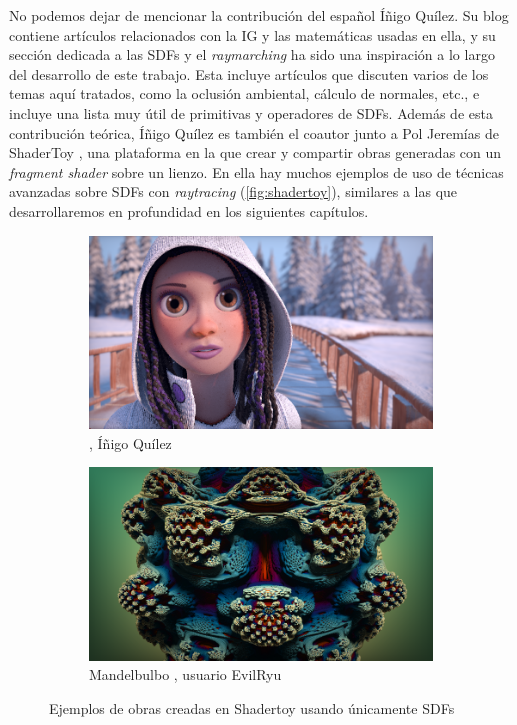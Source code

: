 No podemos dejar de mencionar la contribución del español Íñigo Quílez. Su blog \cite{Quilez_undated-oh} contiene artículos relacionados con la IG y las matemáticas usadas en ella, y su sección dedicada a las SDFs y el \textit{raymarching} ha sido una inspiración a lo largo del desarrollo de este trabajo. Esta incluye artículos que discuten varios de los temas aquí tratados, como la oclusión ambiental, cálculo de normales, etc., e incluye una lista muy útil de primitivas y operadores de SDFs. Además de esta contribución teórica, Íñigo Quílez es también el coautor junto a Pol Jeremías de ShaderToy \cite{shadertoy}, una plataforma en la que crear y compartir obras generadas con un \textit{fragment shader} sobre un lienzo. En ella hay muchos ejemplos de uso de técnicas avanzadas sobre SDFs con \textit{raytracing} (\autoref{fig:shadertoy}), similares a las que desarrollaremos en profundidad en los siguientes capítulos.
\begin{figure}[!h]
    \centering
    \begin{subfigure}[b]{0.45\textwidth}
        \centering
        \includegraphics[width=\textwidth]{Plantilla-TFG-master/img/shadertoy1.png}
        \caption{ \cite{shader2}, Íñigo Quílez}
    \end{subfigure}
    \hspace{15pt}
    \begin{subfigure}[b]{0.45\textwidth}
        \centering
        \includegraphics[width=\textwidth]{Plantilla-TFG-master/img/shadertoy2.png}
        \caption{Mandelbulbo \cite{shader1}, usuario EvilRyu}
    \end{subfigure}
    \hfill
     \caption{Ejemplos de obras creadas en Shadertoy usando únicamente SDFs}
     \label{fig:shadertoy}
\end{figure}
